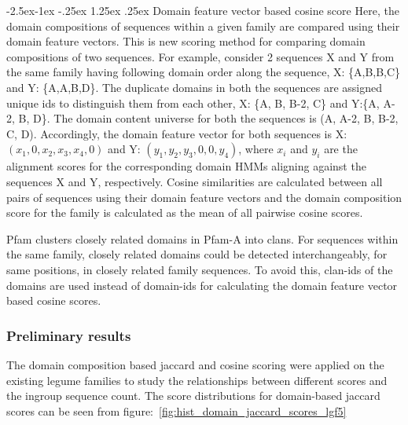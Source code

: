 \documentclass{article}
\makeatletter
\renewcommand\paragraph{\@startsection{paragraph}{4}{\z@}%
	{-2.5ex\@plus -1ex \@minus -.25ex}%
	{1.25ex \@plus .25ex}%
	{\normalfont\normalsize\bfseries}}
\makeatother
\begin{document}
		\paragraph{Domain feature vector based cosine score}
		Here, the domain compositions of sequences within a given family are compared using their domain feature vectors. This is new scoring method for comparing domain compositions of two sequences. For example, consider 2 sequences X and Y from the same family having following domain order along the sequence, X: \{A,B,B,C\} and Y: \{A,A,B,D\}. The duplicate domains in both the sequences are assigned unique ids to distinguish them from each other, X: \{A, B, B-2, C\} and Y:\{A, A-2, B, D\}. The domain content universe for both the sequences is (A, A-2, B, B-2, C, D). Accordingly, the domain feature vector for both sequences is X: $(x_{1}, 0, x_{2}, x_{3}, x_{4}, 0)$ and Y: $(y_{1}, y_{2}, y_{3}, 0, 0, y_{4})$, where $x_{i}$ and $y_{i}$ are the alignment scores for the corresponding domain HMMs aligning against the sequences X and Y, respectively. Cosine similarities are calculated between all pairs of sequences using their domain feature vectors and the domain composition score for the family is calculated as the mean of all pairwise cosine scores.
		
		Pfam clusters closely related domains in Pfam-A into clans. For sequences within the same family, closely related domains could be  detected interchangeably, for same positions, in closely related family sequences. To avoid this, clan-ids of the domains are used instead of domain-ids for calculating the domain feature vector based cosine scores.
		
		\subsubsection{Preliminary results}
		The domain composition based jaccard and cosine scoring were applied on the existing legume families to study the relationships between different scores and the ingroup sequence count. The score distributions for domain-based jaccard scores can be seen from figure:~\ref{fig:hist_domain_jaccard_scores_lgf5}
		
\end{document}

